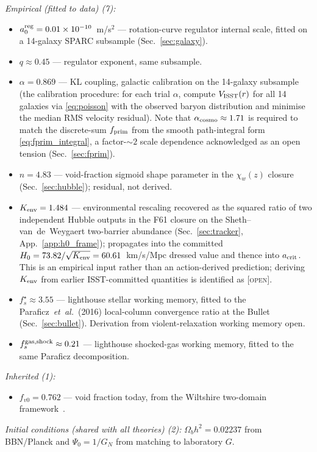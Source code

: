 \documentclass[aps,prd,twocolumn,nofootinbib,floatfix,superscriptaddress]{revtex4-2}
\newcommand{\OPEN}{{\color{black!60!red}\textsc{[open]}}}
\newcommand{\fprim}{f_{\rm prim}}
\begin{document}
\emph{Empirical (fitted to data) (7):}
\begin{itemize}
\item $a_0^{\rm reg} = 0.01\times 10^{-10}$~m/s$^2$ --- rotation-curve
regulator internal scale, fitted on a 14-galaxy SPARC subsample
(Sec.~\ref{sec:galaxy}).
\item $q \approx 0.45$ --- regulator exponent, same subsample.
\item $\alpha = 0.869$ --- KL coupling, galactic calibration on the
14-galaxy subsample (the calibration procedure: for each trial
$\alpha$, compute $V_{\rm ISST}(r)$ for all 14 galaxies via
\eqref{eq:poisson} with the observed baryon distribution and
minimise the median RMS velocity residual). Note that
$\alpha_{\rm cosmo} \approx 1.71$ is required to match the
discrete-sum $\fprim$ from the smooth path-integral form
\eqref{eq:fprim_integral}, a factor-$\sim 2$ scale dependence
acknowledged as an open tension (Sec.~\ref{sec:fprim}).
\item $n = 4.83$ --- void-fraction sigmoid shape parameter in the
$\chi_w(z)$ closure (Sec.~\ref{sec:hubble}); residual, not
derived.
\item $K_{\rm env} = 1.484$ --- environmental rescaling
recovered as the squared ratio of two independent Hubble outputs
in the F61 closure on the Sheth--van~de~Weygaert two-barrier
abundance (Sec.~\ref{sec:tracker}, App.~\ref{app:h0_frame});
propagates into the committed
$H_0 = 73.82/\sqrt{K_{\rm env}} = 60.61$~km/s/Mpc dressed value
and thence into $a_{\rm crit}$. This is an empirical input rather
than an action-derived prediction; deriving $K_{\rm env}$ from
earlier ISST-committed quantities is identified as \OPEN.
\item $f_s^\star \approx 3.55$ --- lighthouse stellar working memory,
fitted to the Paraficz~\emph{et~al.}~(2016) local-column
convergence ratio at the Bullet (Sec.~\ref{sec:bullet}).
Derivation from violent-relaxation working memory open.
\item $f_s^{\rm gas,shock} \approx 0.21$ --- lighthouse
shocked-gas working memory, fitted to the same Paraficz
decomposition.
\end{itemize}

\emph{Inherited (1):}
\begin{itemize}
\item $f_{v0} = 0.762$ --- void fraction today, from the Wiltshire
two-domain framework~\cite{Wiltshire2009}.
\end{itemize}

\emph{Initial conditions (shared with all theories) (2):}
$\Omega_b h^2 = 0.02237$ from BBN/Planck and $\Psi_0 = 1/G_N$ from
matching to laboratory $G$.
\end{document}
